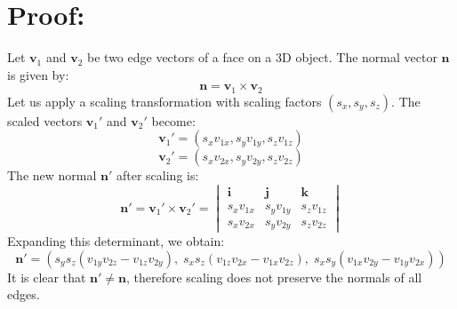 \documentclass{article}
\begin{document}
\section*{Proof:}
Let $\mathbf{v}_1$ and $\mathbf{v}_2$ be two edge vectors of a face on a 3D object. The normal vector $\mathbf{n}$ is given by:
\[
\mathbf{n} = \mathbf{v}_1 \times \mathbf{v}_2
\]
Let us apply a scaling transformation with scaling factors $(s_x, s_y, s_z)$. The scaled vectors $\mathbf{v}_1'$ and $\mathbf{v}_2'$ become:
\[
\mathbf{v}_1' = (s_x v_{1x}, s_y v_{1y}, s_z v_{1z})
\]
\[
\mathbf{v}_2' = (s_x v_{2x}, s_y v_{2y}, s_z v_{2z})
\]
The new normal $\mathbf{n}'$ after scaling is:
\[
\mathbf{n}' = \mathbf{v}_1' \times \mathbf{v}_2' = 
\begin{vmatrix} 
    \mathbf{i} & \mathbf{j} & \mathbf{k} \\
    s_x v_{1x} & s_y v_{1y} & s_z v_{1z} \\
    s_x v_{2x} & s_y v_{2y} & s_z v_{2z} 
\end{vmatrix}
\]
Expanding this determinant, we obtain:
\[
\mathbf{n}' = \left(s_y s_z (v_{1y} v_{2z} - v_{1z} v_{2y}),\; s_x s_z (v_{1z} v_{2x} - v_{1x} v_{2z}),\; s_x s_y (v_{1x} v_{2y} - v_{1y} v_{2x})\right)
\]
It is clear that $\mathbf{n}' \neq \mathbf{n}$, therefore scaling does not preserve the normals of all edges.
\end{document}
